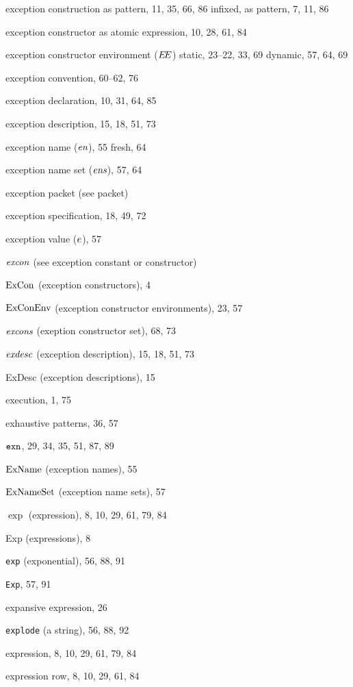 \begin{theindex}
\item exception construction 
\subitem as pattern, 11, 35, 66, 86
\subitem infixed, as pattern, 7, 11, 86
\item exception constructor 
\subitem as atomic expression, 10, 28, 61, 84
\item exception constructor environment ($\mbox{$E\!E$}$) 
\subitem static, 23--22, 33, 69
\subitem dynamic, 57, 64, 69
\item exception convention, 60--62, 76
\item exception declaration, 10, 31, 64, 85
\item exception description, 15, 18, 51, 73
\item exception name ($\mbox{\it en}$), 55
\subitem fresh, 64
\item exception name set ($\mbox{\it ens}$), 57, 64
\item exception packet (see packet) 
\item exception specification, 18, 49, 72
\item exception value ($e$), 57
\item ${\it excon}$ (see exception constant or constructor) 
\item ${\rm ExCon}$ (exception constructors), 4
\item ${\rm ExConEnv}$ (exception constructor environments), 23, 57
\item $\mbox{\it excons}$ (exeption constructor set), 68, 73
\item ${\it exdesc}$ (exception description), 15, 18, 51, 73
\item ExDesc (exception descriptions), 15
\item execution, 1, 75
\item exhaustive patterns, 36, 57
\item $\mbox{\tt exn}$, 29, 34, 35, 51, 87, 89
\item ${\rm ExName}$ (exception names), 55
\item ${\rm ExNameSet}$ (exception name sets), 57
\item $\exp$ (expression), 8, 10, 29, 61, 79, 84
\item Exp (expressions), 8
\item {\tt exp} (exponential), 56, 88, 91
\item {\tt Exp}, 57, 91
\item expansive expression, 26
\item {\tt explode} (a string), 56, 88, 92
\item expression, 8, 10, 29, 61, 79, 84
\item expression row, 8, 10, 29, 61, 84

\end{theindex}
